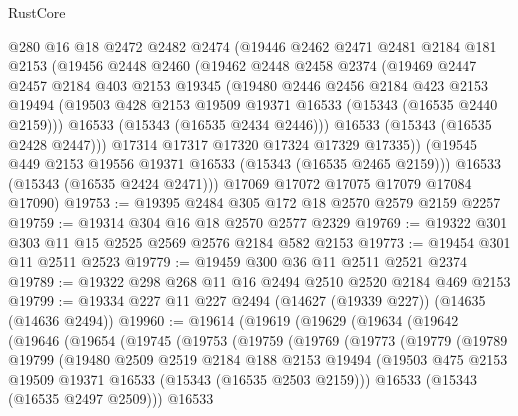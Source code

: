 \begin{lexlean}{RustCore}
\begin{coremodule}
      @280
      @16
      @18
      @2472
      @2482
      @2474
      (@19446
        @2462
        @2471
        @2481
        @2184
        @181
        @2153
        (@19456
          @2448
          @2460
          (@19462
            @2448
            @2458
            @2374
            (@19469
              @2447
              @2457
              @2184
              @403
              @2153
              @19345
              (@19480
                @2446
                @2456
                @2184
                @423
                @2153
                @19494
                (@19503 @428 @2153 @19509 @19371 @16533 (@15343 (@16535 @2440 @2159)))
                @16533
                (@15343 (@16535 @2434 @2446)))
              @16533
              (@15343 (@16535 @2428 @2447)))
            @17314
            @17317
            @17320
            @17324
            @17329
            @17335))
        (@19545 @449 @2153 @19556 @19371 @16533 (@15343 (@16535 @2465 @2159)))
        @16533
        (@15343 (@16535 @2424 @2471)))
      @17069
      @17072
      @17075
      @17079
      @17084
      @17090)
@19753 := @19395 @2484 @305 @172 @18 @2570 @2579 @2159 @2257
@19759 := @19314 @304 @16 @18 @2570 @2577 @2329
@19769 := @19322 @301 @303 @11 @15 @2525 @2569 @2576 @2184 @582 @2153
@19773 := @19454 @301 @11 @2511 @2523
@19779 := @19459 @300 @36 @11 @2511 @2521 @2374
@19789 := @19322 @298 @268 @11 @16 @2494 @2510 @2520 @2184 @469 @2153
@19799 := @19334 @227 @11 @227 @2494 (@14627 (@19339 @227)) (@14635 (@14636 @2494))
@19960 := @19614
    (@19619
      (@19629
        (@19634
          (@19642
            (@19646
              (@19654
                (@19745
                  (@19753
                    (@19759
                      (@19769
                        (@19773
                          (@19779
                            (@19789
                              @19799
                              (@19480
                                @2509
                                @2519
                                @2184
                                @188
                                @2153
                                @19494
                                (@19503
                                  @475
                                  @2153
                                  @19509
                                  @19371
                                  @16533
                                  (@15343 (@16535 @2503 @2159)))
                                @16533
                                (@15343 (@16535 @2497 @2509)))
                              @16533

\end{coremodule}
\end{lexlean}
